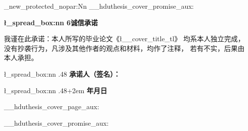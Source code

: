 \cs_new_protected_nopar:Nn \__hduthesis_cover_promise_aux:
  {
    \vspace*{3.75\baselineskip}
    \begin{center}
      \@beginparpenalty\@lowpenalty
      \Large\textsf{\bfseries \l_spread_box:nn {6\ccwd}{诚信承诺}}
      \@endparpenalty\@M
    \end{center}
    \vspace*{.6\baselineskip}\par
    \linespread{1.9}
      {\large
        我谨在此承诺：本人所写的毕业论文《\l__cover_title_tl》
        均系本人独立完成，没有抄袭行为，凡涉及其他作者的观点和材料，均作了注释，
        若有不实，后果由本人承担。\par\vspace*{1.1\baselineskip}
        \l_spread_box:nn {.48\linewidth}{}
          \textsf{\bfseries 承诺人（签名）：}
        \vspace*{.4\baselineskip}\par
        \l_spread_box:nn {.48\linewidth+2em}{}
          \textsf{\bfseries 年\qquad 月\qquad 日}
      }
  }

\RenewDocumentCommand \maketitle {}
  {
    \begin{titlepage}
      \__hduthesis_cover_page_aux:
    \end{titlepage}
    \titlepage
      \__hduthesis_cover_promise_aux:
    \endtitlepage
  }
\endinput